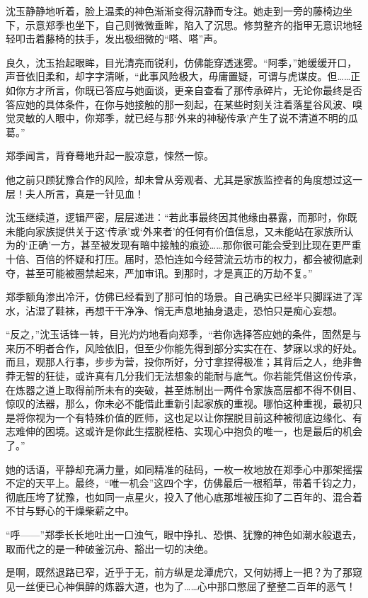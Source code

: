沈玉静静地听着，脸上温柔的神色渐渐变得沉静而专注。她走到一旁的藤椅边坐下，示意郑季也坐下，自己则微微垂眸，陷入了沉思。修剪整齐的指甲无意识地轻轻叩击着藤椅的扶手，发出极细微的“嗒、嗒”声。

良久，沈玉抬起眼眸，目光清亮而锐利，仿佛能穿透迷雾。“阿季，”她缓缓开口，声音依旧柔和，却字字清晰，“此事风险极大，毋庸置疑，可谓与虎谋皮。但……正如你方才所言，你既已答应与她面谈，更亲自查看了那传承碎片，无论你最终是否答应她的具体条件，在你与她接触的那一刻起，在某些时刻关注着落星谷风波、嗅觉灵敏的人眼中，你郑季，就已经与那‘外来的神秘传承’产生了说不清道不明的瓜葛。”

郑季闻言，背脊蓦地升起一股凉意，悚然一惊。

他之前只顾犹豫合作的风险，却未曾从旁观者、尤其是家族监控者的角度想过这一层！夫人所言，真是一针见血！

沈玉继续道，逻辑严密，层层递进：“若此事最终因其他缘由暴露，而那时，你既未能向家族提供关于这‘传承’或‘外来者’的任何有价值信息，又未能站在家族所认为的‘正确’一方，甚至被发现有暗中接触的痕迹……那你很可能会受到比现在更严重十倍、百倍的怀疑和打压。届时，恐怕连如今经营流云坊市的权力，都会被彻底剥夺，甚至可能被圈禁起来，严加审讯。到那时，才是真正的万劫不复。”

郑季额角渗出冷汗，仿佛已经看到了那可怕的场景。自己确实已经半只脚踩进了浑水，沾湿了鞋袜，再想干干净净、悄无声息地抽身退走，恐怕只是痴心妄想。

“反之，”沈玉话锋一转，目光灼灼地看向郑季，“若你选择答应她的条件，固然是与来历不明者合作，风险依旧，但至少你能先得到部分实实在在、梦寐以求的好处。而且，观那人行事，步步为营，投你所好，分寸拿捏得极准；其背后之人，绝非鲁莽无智的狂徒，或许真有几分我们无法想象的能耐与底气。你若能凭借这份传承，在炼器之道上取得前所未有的突破，甚至炼制出一两件令家族高层都不得不侧目、惊叹的法器，那么，你未必不能借此重新引起家族的重视。哪怕这种重视，最初只是将你视为一个有特殊价值的匠师，这也足以让你摆脱目前这种被彻底边缘化、有志难伸的困境。这或许是你此生摆脱桎梏、实现心中抱负的唯一，也是最后的机会了。”

她的话语，平静却充满力量，如同精准的砝码，一枚一枚地放在郑季心中那架摇摆不定的天平上。最终，“唯一机会”这四个字，仿佛最后一根稻草，带着千钧之力，彻底压垮了犹豫，也如同一点星火，投入了他心底那堆被压抑了二百年的、混合着不甘与野心的干燥柴薪之中。

“呼——”郑季长长地吐出一口浊气，眼中挣扎、恐惧、犹豫的神色如潮水般退去，取而代之的是一种破釜沉舟、豁出一切的决绝。

是啊，既然退路已窄，近乎于无，前方纵是龙潭虎穴，又何妨搏上一把？为了那窥见一丝便已心神俱醉的炼器大道，也为了……心中那口憋屈了整整二百年的恶气！

